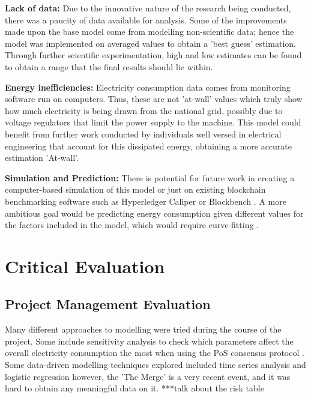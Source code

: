 \textbf{Lack of data:} Due to the innovative nature of the research being conducted, there was a paucity of data available for analysis. Some of the improvements made upon the base model come from modelling non-scientific data; hence the model was implemented on averaged values to obtain a 'best guess' estimation. Through further scientific experimentation, high and low estimates can be found to obtain a range that the final results should lie within. 

\textbf{Energy inefficiencies: } Electricity consumption data comes from monitoring software run on computers. Thus, these are not 'at-wall' values which truly show how much electricity is being drawn from the national grid, possibly due to voltage regulators that limit the power supply to the machine. This model could benefit from further work conducted by individuals well versed in electrical engineering that account for this dissipated energy, obtaining a more accurate estimation 'At-wall'.

\textbf{Simulation and Prediction: } There is potential for future work in creating a computer-based simulation of this model or just on existing blockchain benchmarking software such as Hyperledger Caliper or Blockbench \cite{Aldweesh2020BenchmarkingApplications}. A more ambitious goal would be predicting energy consumption given different values for the factors included in the model, which would require curve-fitting \cite{IbanezTheExpansion}.

\section{Critical Evaluation}

\subsection{Project Management Evaluation}

Many different approaches to modelling were tried during the course of the project. Some include sensitivity analysis to check which parameters affect the overall electricity consumption the most when using the PoS consensus protocol \cite{MarionAnModelling}. Some data-driven modelling techniques explored included time series analysis and logistic regression \cite{IbanezTheExpansion} however, the 'The Merge' is a very recent event, and it was hard to obtain any meaningful data on it.  ***talk about the risk table

